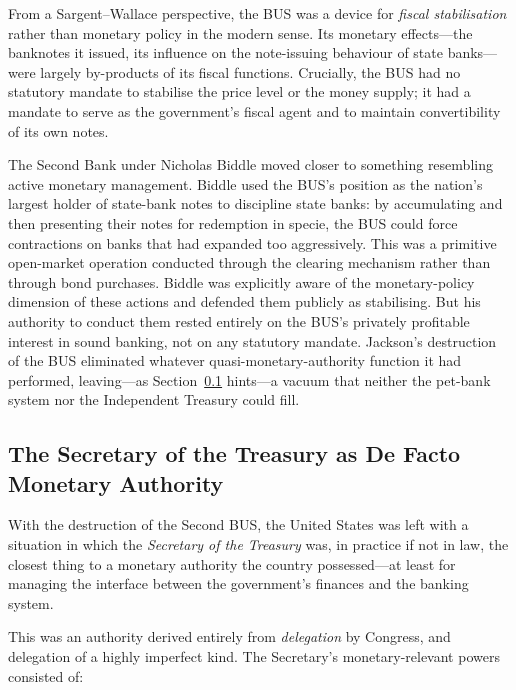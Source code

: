 \documentclass[12pt]{article}
\begin{document}
From a Sargent--Wallace perspective, the BUS was a device for
\emph{fiscal stabilisation} rather than monetary policy in the modern
sense.  Its monetary effects---the banknotes it issued, its influence
on the note-issuing behaviour of state banks---were largely
by-products of its fiscal functions.  Crucially, the BUS had no
statutory mandate to stabilise the price level or the money supply; it
had a mandate to serve as the government's fiscal agent and to
maintain convertibility of its own notes.

The Second Bank under Nicholas Biddle moved closer to something
resembling active monetary management.  Biddle used the BUS's position
as the nation's largest holder of state-bank notes to discipline state
banks: by accumulating and then presenting their notes for redemption
in specie, the BUS could force contractions on banks that had expanded
too aggressively.  This was a primitive open-market operation conducted
through the clearing mechanism rather than through bond purchases.
Biddle was explicitly aware of the monetary-policy dimension of these
actions and defended them publicly as stabilising.  But his authority
to conduct them rested entirely on the BUS's privately profitable
interest in sound banking, not on any statutory mandate.  Jackson's
destruction of the BUS eliminated whatever quasi-monetary-authority
function it had performed, leaving---as Section~\ref{sec:monetary_who}
hints---a vacuum that neither the pet-bank system nor the Independent
Treasury could fill.

\subsection{The Secretary of the Treasury as De Facto Monetary
Authority}
\label{sec:monetary_who}

With the destruction of the Second BUS, the United States was left
with a situation in which the \emph{Secretary of the Treasury}
was, in practice if not in law, the closest thing to a monetary
authority the country possessed---at least for managing the interface
between the government's finances and the banking system.

This was an authority derived entirely from \emph{delegation} by
Congress, and delegation of a highly imperfect kind.  The Secretary's
monetary-relevant powers consisted of:
\end{document}
